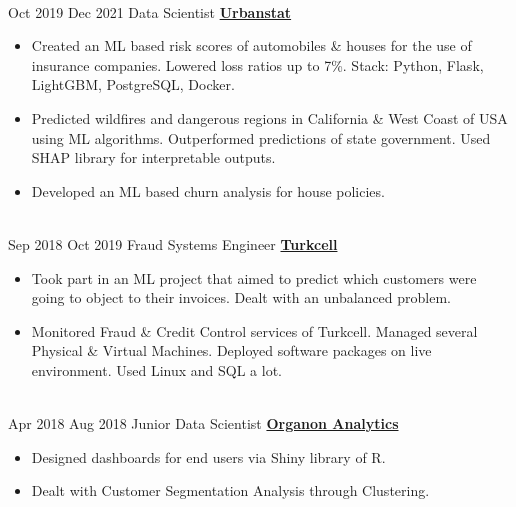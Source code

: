 \documentclass[letterpaper]{DS_class_file} %
\begin{document}
\begin{twenty}
{\begin{itemize}
                
		\end{itemize}}
		\\
	\twentyitem
		{Oct 2019}
		{Dec 2021}
		{\hspace{0.3cm}Data Scientist}
		{\href{https://www.urbanstat.com/}{\textbf{Urbanstat}}}
		{}
		{\begin{itemize}
			\item Created an ML based risk scores of automobiles \& houses for the use of insurance companies. Lowered loss ratios up to 7\%. \newline Stack: Python, Flask, LightGBM, PostgreSQL, Docker.
			\item Predicted wildfires and dangerous regions in California \& West Coast of USA using ML algorithms. Outperformed predictions of state government. Used SHAP library for interpretable outputs.
			\item Developed an ML based churn analysis for house policies.
		\end{itemize}}
		\\
	\twentyitem
		{Sep 2018}
		{Oct 2019}
		{\hspace{0.3cm}Fraud Systems Engineer}
		{\href{https://www.turkcell.com.tr/}{\textbf{Turkcell}}}
		{}
		{\begin{itemize}
			\item Took part in an ML project that aimed to predict which customers were going to object to their invoices. Dealt with an unbalanced problem.
			\item Monitored Fraud \& Credit Control services of Turkcell. Managed several Physical \& Virtual Machines. Deployed software packages on live environment. Used Linux and SQL a lot.
		\end{itemize}}
		\\
	\twentyitem
		{Apr 2018}
		{Aug 2018}
		{\hspace{0.3cm}Junior Data Scientist}
		{\href{http://www.organonanalytics.com/pages/index.php}{\textbf{Organon Analytics}}}
		{}
		{\begin{itemize}
			\item Designed dashboards for end users via Shiny library of R.
			\item Dealt with Customer Segmentation Analysis through Clustering.
		\end{itemize}}
		\\
\end{twenty}
\end{document}
